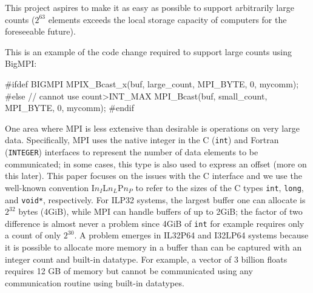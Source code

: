 This project aspires to make it as easy as possible to support arbitrarily
large counts ($2^{63}$ elements exceeds the local storage capacity of computers
for the foreseeable future).

This is an example of the code change required to support large counts using
BigMPI:
\begin{code}
#ifdef BIGMPI
    MPIX_Bcast_x(buf, large_count, MPI_BYTE, 0, mycomm);
#else // cannot use count>INT_MAX
    MPI_Bcast(buf, small_count, MPI_BYTE, 0, mycomm);
#endif
\end{code}




One area where MPI is less extensive than desirable is operations on very large data.
Specifically, MPI uses the native integer in the C (\texttt{int}) and Fortran (\texttt{INTEGER})
interfaces to represent the number of data elements to be communicated;
in some cases, this type is also used to express an offset (more on this later).  
This paper focuses on the issues with the C interface and we use the
well-known convention I$n_{I}$L$n_{L}$P$n_{P}$ to refer to the sizes
of the C types \texttt{int}, \texttt{long}, and \texttt{void*}, respectively.
For ILP32 systems, the largest buffer one can allocate is $2^{32}$ bytes (4GiB),
while MPI can handle buffers of up to 2GiB; the factor of two difference is
almost never a problem since 4GiB of \texttt{int} for example requires only
a count of only $2^30$.
A problem emerges in IL32P64 and I32LP64 systems because it is possible to allocate
more memory in a buffer than can be captured with an integer count and built-in datatype.
For example, a vector of 3 billion floats requires 12 GB of memory but cannot be 
communicated using any communication routine using built-in datatypes.

